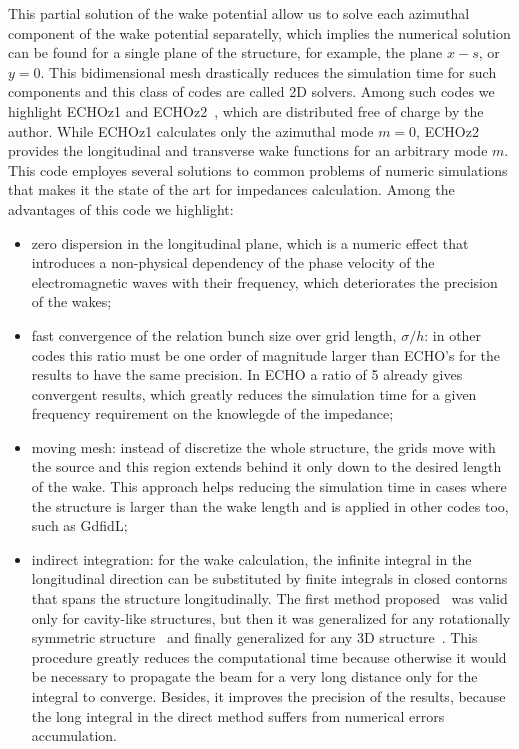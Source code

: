     This partial solution of the wake potential allow us to solve each azimuthal component of the wake potential separatelly, which implies the numerical solution can be found for a single plane of the structure, for example, the plane $x-s$, or $y=0$. This bidimensional mesh drastically reduces the simulation time for such components and this class of codes are called 2D solvers. Among such codes we highlight ECHOz1 and ECHOz2~\cite{Zagorodnov2003, Zagorodnov2005, Zagorodnov2006a}, which are distributed free of charge by the author. While ECHOz1 calculates only the azimuthal mode $m=0$, ECHOz2 provides the longitudinal and transverse wake functions for an arbitrary mode $m$.  This code employes several solutions to common problems of numeric simulations that makes it the state of the art for impedances calculation. Among the advantages of this code we highlight:
    \begin{itemize}
	    \item zero dispersion in the longitudinal plane, which is a numeric effect that introduces a non-physical dependency of the phase velocity of the electromagnetic waves with their frequency, which deteriorates the precision of the wakes;
	    \item fast convergence of the relation bunch size over grid length, $\sigma/h$: in other codes this ratio must be one order of magnitude larger than ECHO's for the results to have the same precision. In ECHO a ratio of \SI{5}{} already gives convergent results, which greatly reduces the simulation time for a given frequency requirement on the knowlegde of the impedance;
	    \item moving mesh: instead of discretize the whole structure, the grids move with the source and this region extends behind it only down to the desired length of the wake. This approach helps reducing the simulation time in cases where the structure is larger than the wake length and is applied in other codes too, such as GdfidL;
	    \item indirect integration: for the wake calculation, the infinite integral in the longitudinal direction can be substituted by finite integrals in closed contorns that spans the structure longitudinally. The first method proposed~\cite{Weiland} was valid only for cavity-like structures, but then it was generalized for any rotationally symmetric structure~\cite{Napoly1993, Zagorodnov2005} and finally generalized for any 3D structure~\cite{Zagorodnov2006}. This procedure greatly reduces the computational time because otherwise it would be necessary to propagate the beam for a very long distance only for the integral to converge. Besides, it improves the precision of the results, because the long integral in the direct method suffers from numerical errors accumulation.
    \end{itemize}

